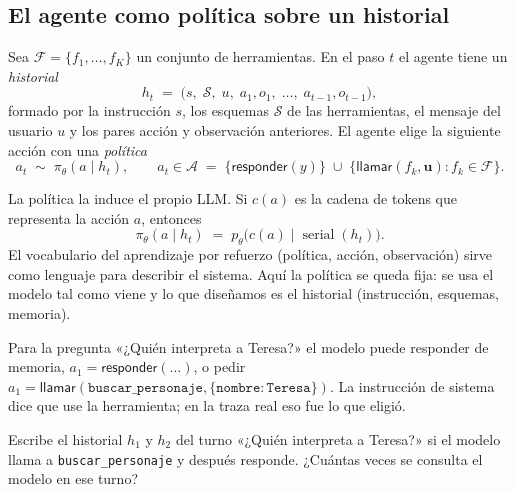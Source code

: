\documentclass[11pt,letterpaper,oneside]{report}
\begin{document}
\subsection{El agente como política sobre un historial}

\begin{definicion}
Sea $\mathcal{F}=\{f_1,\dots,f_K\}$ un conjunto de herramientas. En el paso $t$ el agente tiene un \emph{historial}
\[
h_t \;=\; \bigl(s,\; \mathcal{S},\; u,\; a_1, o_1,\; \dots,\; a_{t-1}, o_{t-1}\bigr),
\]
formado por la instrucción $s$, los esquemas $\mathcal{S}$ de las herramientas, el mensaje del usuario $u$ y los pares acción y observación anteriores. El agente elige la siguiente acción con una \emph{política}
\begin{equation}
a_t \;\sim\; \pi_\theta(a \mid h_t),
\qquad
a_t \in \mathcal{A} \;=\; \{\textsf{responder}(y)\} \;\cup\; \{\textsf{llamar}(f_k, \mathbf{u}) : f_k\in\mathcal{F}\}.
\label{eq:politica}
\end{equation}
\end{definicion}

La política la induce el propio LLM. Si $c(a)$ es la cadena de tokens que representa la acción $a$, entonces
\begin{equation}
\pi_\theta(a \mid h_t) \;=\; p_\theta\bigl(c(a) \mid \operatorname{serial}(h_t)\bigr).
\label{eq:inducida}
\end{equation}
El vocabulario del aprendizaje por refuerzo (política, acción, observación) sirve como lenguaje para describir el sistema. Aquí la política se queda fija: se usa el modelo tal como viene y lo que diseñamos es el historial (instrucción, esquemas, memoria).

\begin{ejemplo}
Para la pregunta «¿Quién interpreta a Teresa?» el modelo puede responder de memoria, $a_1=\textsf{responder}(\dots)$, o pedir $a_1=\textsf{llamar}(\texttt{buscar\_personaje}, \{\texttt{nombre}: \texttt{Teresa}\})$. La instrucción de sistema dice que use la herramienta; en la traza real eso fue lo que eligió.
\end{ejemplo}

\begin{ejercicio}
Escribe el historial $h_1$ y $h_2$ del turno «¿Quién interpreta a Teresa?» si el modelo llama a \texttt{buscar\_personaje} y después responde. ¿Cuántas veces se consulta el modelo en ese turno?
\end{ejercicio}
\end{document}
